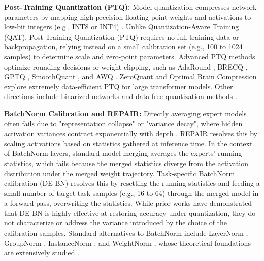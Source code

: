 \documentclass{article}
\begin{document}
\textbf{Post-Training Quantization (PTQ):} Model quantization compresses network parameters by mapping high-precision floating-point weights and activations to low-bit integers (e.g., INT8 or INT4) \cite{gholami21, nagel21}. Unlike Quantization-Aware Training (QAT), Post-Training Quantization (PTQ) requires no full training data or backpropagation, relying instead on a small calibration set (e.g., 100 to 1024 samples) to determine scale and zero-point parameters. Advanced PTQ methods optimize rounding decisions or weight clipping, such as AdaRound \cite{nagel20}, BRECQ \cite{li21}, GPTQ \cite{frantar23}, SmoothQuant \cite{shao23}, and AWQ \cite{lin23}. ZeroQuant \cite{yao22} and Optimal Brain Compression \cite{frantar23obc} explore extremely data-efficient PTQ for large transformer models. Other directions include binarized networks \cite{courbariaux16, rastegari16} and data-free quantization methods \cite{nagel19, cai20, frantar22}.

\textbf{BatchNorm Calibration and REPAIR:} Directly averaging expert models often fails due to "representation collapse" or "variance decay", where hidden activation variances contract exponentially with depth \cite{jordan23, qu25}. REPAIR \cite{jordan23} resolves this by scaling activations based on statistics gathered at inference time. In the context of BatchNorm layers, standard model merging averages the experts' running statistics, which fails because the merged statistics diverge from the activation distribution under the merged weight trajectory. Task-specific BatchNorm calibration (DE-BN) \cite{shomron20} resolves this by resetting the running statistics and feeding a small number of target task samples (e.g., 16 to 64) through the merged model in a forward pass, overwriting the statistics. While prior works \cite{qu25, stoica23} have demonstrated that DE-BN is highly effective at restoring accuracy under quantization, they do not characterize or address the variance introduced by the choice of the calibration samples. Standard alternatives to BatchNorm include LayerNorm \cite{ba16}, GroupNorm \cite{wu18}, InstanceNorm \cite{ulyanov16}, and WeightNorm \cite{salimans16}, whose theoretical foundations are extensively studied \cite{santurkar18, li18}.
\end{document}
